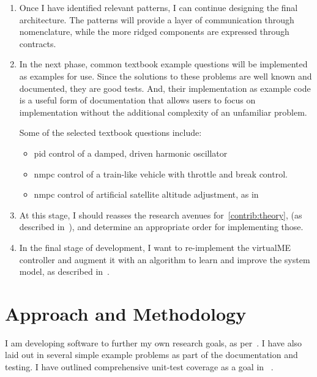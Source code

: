 %
\begin{enumerate}
  \item Once I have identified relevant patterns, I can continue designing the
  final architecture. The patterns will provide a layer of communication through
  nomenclature, while the more ridged components are expressed through
  contracts.
  \item In the next phase, common textbook example questions will be implemented
  as examples for use. Since the solutions to these problems are well known and
  documented, they are good tests. And, their implementation as example code is
  a useful form of documentation that allows users to focus on implementation
  without the additional complexity of an unfamiliar problem.

  Some of the selected textbook questions include:
  \begin{itemize}
    \item \ac{pid} control of a damped, driven harmonic oscillator
    \item \ac{nmpc} control of a train-like vehicle with throttle and break
    control.~\cite[p.~5]{Kirk2004}
    \item \ac{nmpc} control of artificial satellite altitude adjustment, as
    in~\cite[p.~1]{Vinter2010}
  \end{itemize}
  \item At this stage, I should reasses the research avenues
  for~\ref{contrib:theory}, (as described
  in~), and determine an appropriate
  order for implementing those.
  \item In the final stage of development, I want to re-implement the virtualME
  controller and augment it with an algorithm to learn and improve the system
  model, as described in~.
\end{enumerate}
%



\section{Approach and Methodology}


I am developing software to further my own research goals, as
per~. I have also laid out in
several simple example problems as part of the documentation and testing. I have
outlined comprehensive unit-test coverage as a goal in~
.

